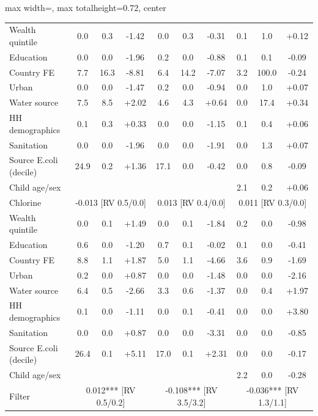 \begin{landscape}
\begin{table}[htbp]
\begin{adjustbox}{max width=\linewidth, max totalheight=0.72\textwidth, center}
\begin{tabular}{l|ccc|ccc|ccc}
\quad Wealth quintile & 0.0 & 0.3 & -1.42 & 0.0 & 0.3 & -0.31 & 0.1 & 1.0 & +0.12 \\
\quad Education & 0.0 & 0.0 & -1.96 & 0.2 & 0.0 & -0.88 & 0.1 & 0.1 & -0.09 \\
\quad Country FE & 7.7 & 16.3 & -8.81 & 6.4 & 14.2 & -7.07 & 3.2 & 100.0 & -0.24 \\
\quad Urban & 0.0 & 0.0 & -1.47 & 0.2 & 0.0 & -0.94 & 0.0 & 1.0 & +0.07 \\
\quad Water source & 7.5 & 8.5 & +2.02 & 4.6 & 4.3 & +0.64 & 0.0 & 17.4 & +0.34 \\
\quad HH demographics & 0.1 & 0.3 & +0.33 & 0.0 & 0.0 & -1.15 & 0.1 & 0.4 & +0.06 \\
\quad Sanitation & 0.0 & 0.0 & -1.96 & 0.0 & 0.0 & -1.91 & 0.0 & 1.3 & +0.07 \\
\quad Source E.coli (decile) & 24.9 & 0.2 & +1.36 & 17.1 & 0.0 & -0.42 & 0.0 & 0.8 & -0.09 \\
\quad Child age/sex &  &  &  &  &  &  & 2.1 & 0.2 & +0.06 \\
\midrule
Chlorine & \multicolumn{3}{c|}{-0.013 {\scriptsize[RV 0.5/0.0]}} & \multicolumn{3}{c|}{0.013 {\scriptsize[RV 0.4/0.0]}} & \multicolumn{3}{c}{0.011 {\scriptsize[RV 0.3/0.0]}} \\
\quad Wealth quintile & 0.0 & 0.1 & +1.49 & 0.0 & 0.1 & -1.84 & 0.2 & 0.0 & -0.98 \\
\quad Education & 0.6 & 0.0 & -1.20 & 0.7 & 0.1 & -0.02 & 0.1 & 0.0 & -0.41 \\
\quad Country FE & 8.8 & 1.1 & +1.87 & 5.0 & 1.1 & -4.66 & 3.6 & 0.9 & -1.69 \\
\quad Urban & 0.2 & 0.0 & +0.87 & 0.0 & 0.0 & -1.48 & 0.0 & 0.0 & -2.16 \\
\quad Water source & 6.4 & 0.5 & -2.66 & 3.3 & 0.6 & -1.37 & 0.0 & 0.4 & +1.97 \\
\quad HH demographics & 0.1 & 0.0 & -1.11 & 0.0 & 0.1 & -0.41 & 0.0 & 0.0 & +3.80 \\
\quad Sanitation & 0.0 & 0.0 & +0.87 & 0.0 & 0.0 & -3.31 & 0.0 & 0.0 & -0.85 \\
\quad Source E.coli (decile) & 26.4 & 0.1 & +5.11 & 17.0 & 0.1 & +2.31 & 0.0 & 0.0 & -0.17 \\
\quad Child age/sex &  &  &  &  &  &  & 2.2 & 0.0 & -0.28 \\
\midrule
Filter & \multicolumn{3}{c|}{0.012*** {\scriptsize[RV 0.5/0.2]}} & \multicolumn{3}{c|}{-0.108*** {\scriptsize[RV 3.5/3.2]}} & \multicolumn{3}{c}{-0.036*** {\scriptsize[RV 1.3/1.1]}} \\

\end{tabular}
\end{adjustbox}
\end{table}
\end{landscape}
